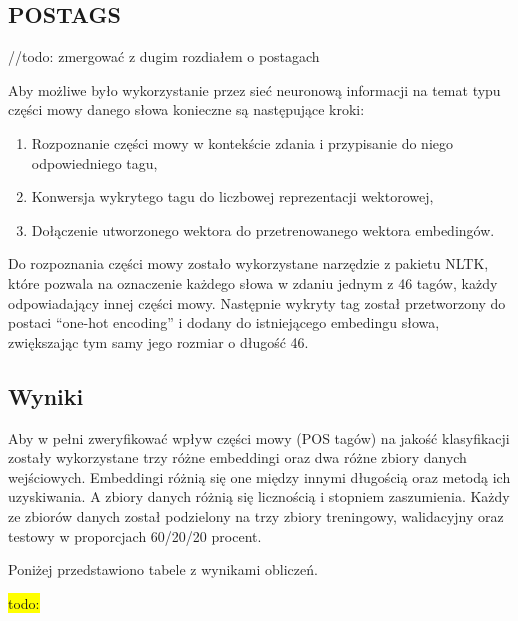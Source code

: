 \subsection{POSTAGS}
//todo: zmergować z dugim rozdiałem o postagach

Aby możliwe było wykorzystanie przez sieć neuronową informacji na temat typu części mowy danego słowa konieczne są następujące kroki:

\begin{enumerate}
    \item Rozpoznanie części mowy w kontekście zdania i przypisanie do niego odpowiedniego tagu,
    \item Konwersja wykrytego tagu do liczbowej reprezentacji wektorowej,
    \item Dołączenie utworzonego wektora do przetrenowanego wektora embedingów.
\end{enumerate}

\hfill \break %
Do rozpoznania części mowy zostało wykorzystane narzędzie z pakietu NLTK, które pozwala na oznaczenie każdego słowa w zdaniu jednym z 46 tagów, każdy odpowiadający innej części mowy. Następnie wykryty tag został przetworzony do postaci “one-hot encoding” i dodany do istniejącego embedingu słowa, zwiększając tym samy jego rozmiar o długość 46.


\subsection{Wyniki}

Aby w pełni zweryfikować wpływ części mowy (POS tagów) na jakość klasyfikacji zostały wykorzystane trzy różne embeddingi oraz dwa różne zbiory danych wejściowych. Embeddingi różnią się one między innymi długością oraz metodą ich uzyskiwania. A zbiory danych różnią się licznością i stopniem zaszumienia. Każdy ze zbiorów danych został podzielony na trzy zbiory treningowy, walidacyjny oraz testowy w proporcjach 60/20/20 procent.

Poniżej przedstawiono tabele z wynikami obliczeń.

\colorbox{yellow}{todo:}\\



